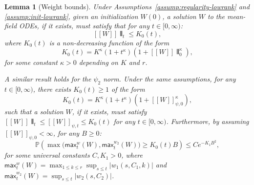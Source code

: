 \documentclass[11pt]{article}
\newcommand{\Pp}{\mathbb{P}}
\newcommand{\1}{\mathbbm{1}}
\newcommand{\llbracket}{[\![}
\newcommand{\rrbracket}{]\!]}
\newcommand{\interleave}[1]{\llbracket #1 \rrbracket}
\newtheorem{lemma}{Lemma}
\begin{document}
\begin{lemma}[Weight bounds]
\label{lem:bounds-a-priori}
Under Assumptions~\ref{assump:regularity-lowrank} and \ref{assump:init-lowrank}, given an initialization $W(0)$, a solution $W$ to the mean-field ODEs, if it exists, must satisfy that for any $t\in[0,\infty)$:
\[
\interleave W\interleave_t \le K_0(t),
\]
where $K_0(t)$ is a non-decreasing function of the form
\[
K_0(t) = K^{\kappa}(1+t^{\kappa})(1+\interleave W\interleave_0^{\kappa}),
\]
for some constant $\kappa>0$ depending on $K$ and $r$.

A similar result holds for the $\psi_2$ norm. Under the same assumptions, for any $t\in[0,\infty)$, there exists $K_0(t)\ge 1$ of the form
\[
K_0(t) = K^{\kappa}(1+t^{\kappa})(1+\llbracket W\rrbracket_{\psi,0}^{\kappa}),
\]
such that a solution $W$, if it exists, must satisfy $\interleave W\interleave_t \le \llbracket W\rrbracket_{\psi,t} \le K_0(t)$ for any $t\in[0,\infty)$. Furthermore, by assuming $\llbracket W\rrbracket_{\psi,0}<\infty$, for any $B\ge 0$:
\[
\Pp\!\left(\max\big(\mathsf{max}_t^w(W), \mathsf{max}_t^{w_2}(W)\big)\ge K_0(t)B\right) \le C e^{-K_1 B^2},
\]
for some universal constants $C, K_1>0$, where $\mathsf{max}_t^w(W) = \max_{1\le k\le r}\sup_{s\le t}|w_1(s,C_1,k)|$ and $\mathsf{max}_t^{w_2}(W) = \sup_{s\le t}|w_2(s,C_2)|$.
\end{lemma}
\end{document}
